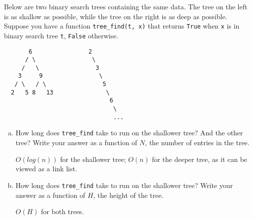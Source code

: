 \question 
Below are two binary search trees containing the same data. The tree on the left is as shallow as
possible, while the tree on the right is as deep as
possible. Suppose you have a function \texttt{tree\_find(t, x)} that returns
\texttt{True} when \texttt{x} is in binary search tree \texttt{t},
\texttt{False} otherwise.

\begin{center}
\begin{lstlisting}
       6                2
      / \                \
     /   \                3
    3     9                \
   / \   / \                5
  2   5 8   13               \
                              6
                               \
                               ...
\end{lstlisting}
\end{center}

\begin{enumerate}[a.]
\item
How long does \texttt{tree\_find} take to run on the shallower tree? And the other tree? Write your answer as a function of $N$, the number of entries in the tree.
\begin{solution}[0.5in]
$O(log(n))$ for the shallower tree; $O(n)$ for the deeper tree, as it can be
viewed as a link list. 
\end{solution}

\item 
How long does \texttt{tree\_find} take to run on the shallower tree? Write your answer as a function of $H$, the height of the tree.
\begin{solution}[0.5in]
$O(H)$ for both trees.
\end{solution}
\end{enumerate}

\iffalse
\begin{center}
\begin{tikzpicture}[very thick,level/.style={sibling distance=70mm/#1},
                    level distance=24pt]
\node [vertex] (r){$6$}
  child {
    node [vertex] (a) {$3$}
    child {
      node [vertex] {$2$}
    }
    child {
      node [vertex] {$5$}
    }
  }
  child {
    node [vertex] {$9$}
    child {
      node [vertex] {$8$}
    }
    child {
      node [vertex] {$13$}
    }
  };
\end{tikzpicture}
\end{center}
\fi

\iffalse
\begin{tikzpicture}[very thick,level/.style={sibling distance=70mm/#1},
                    level distance=24pt]
\node [vertex] (r){$6$}
  child {
    node [vertex] (a) {$3$}
    child {
      node [vertex] {$2$}
    }
  };
\end{tikzpicture}
\fi
